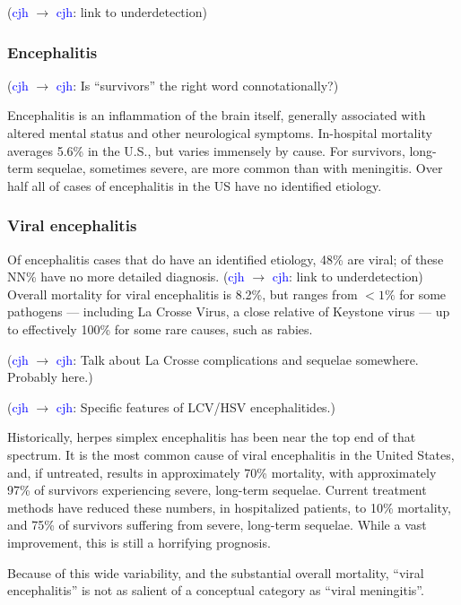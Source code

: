 \documentclass{article}
\newcommand{\cjh}{\textcolor{blue}{cjh}}
\newcommand{\msg}[3]{(#1 $\rightarrow$ #2: #3)}
\newcommand{\mcc}[1]{\msg\cjh\cjh{#1}}
\begin{document}
            \mcc{link to underdetection}

        \subsubsection{Encephalitis}
            \mcc{Is ``survivors'' the right word connotationally?}

            Encephalitis is an inflammation of the brain itself, generally associated with altered mental status and other neurological symptoms. In-hospital mortality averages 5.6\% in the U.S., but varies immensely by cause. For survivors, long-term sequelae, sometimes severe, are more common than with meningitis. Over half all of cases of encephalitis in the US have no identified etiology.
            
        \subsubsection{Viral encephalitis}
            Of encephalitis cases that do have an identified etiology, 48\% are viral; of these NN\% have no more detailed diagnosis. \mcc{link to underdetection} Overall mortality for viral encephalitis is 8.2\%, but ranges from $<1\%$ for some pathogens --- including La Crosse Virus, a close relative of Keystone virus --- up to effectively 100\% for some rare causes, such as rabies.

            \mcc{Talk about La Crosse complications and sequelae somewhere. Probably here.}

            \mcc{Specific features of LCV/HSV encephalitides.}

            Historically, herpes simplex encephalitis has been near the top end of that spectrum. It is the most common cause of viral encephalitis in the United States, and, if untreated, results in approximately 70\% mortality, with approximately 97\% of survivors experiencing severe, long-term sequelae. Current treatment methods have reduced these numbers, in hospitalized patients, to 10\% mortality, and 75\% of survivors suffering from severe, long-term sequelae. While a vast improvement, this is still a horrifying prognosis.
            
            Because of this wide variability, and the substantial overall mortality, ``viral encephalitis'' is not as salient of a conceptual category as ``viral meningitis''. 
\end{document}
